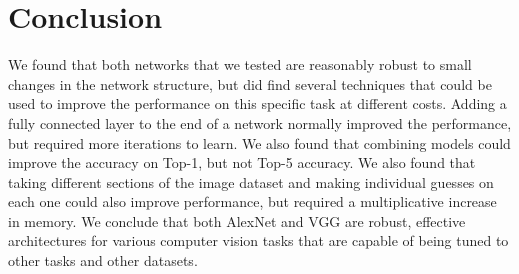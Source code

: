 \documentclass[10pt,twocolumn,letterpaper]{article}
\begin{document}
\section{Conclusion}
We found that both networks that we tested are reasonably robust to small changes in the network structure, but did find several techniques that could be used to improve the performance on this specific task at different costs.  Adding a fully connected layer to the end of a network normally improved the performance, but required more iterations to learn.  We also found that combining models could improve the accuracy on Top-1, but not Top-5 accuracy.  We also found that taking different sections of the image dataset and making individual guesses on each one could also improve performance, but required a multiplicative increase in memory. 
We conclude that both AlexNet and VGG are robust, effective architectures
for various computer vision tasks that are capable of being tuned to
other tasks and other datasets.


{\small


}
\end{document}
